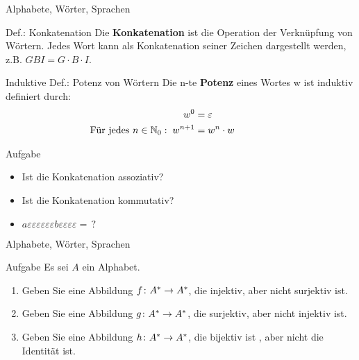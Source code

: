 \begin{frame}{Alphabete, Wörter, Sprachen}
	\begin{block}{Def.: Konkatenation}
		Die \textbf{Konkatenation} ist die Operation der Verknüpfung von Wörtern. Jedes Wort kann als Konkatenation seiner Zeichen dargestellt werden, z.B. \(GBI = G \cdot B \cdot I\).
	\end{block}
	\pause
	\begin{block}{Induktive Def.: Potenz von Wörtern}
		Die n-te \textbf{Potenz} eines Wortes w ist induktiv definiert durch:
		\begin{align*}
				w^{0} &= \varepsilon \hphantom{000000000000}\\
				\text{Für jedes } n \in \mathbb{N}_{0}: \; w^{n+1} & = w^{n} \cdot w
		\end{align*}
	\end{block}
	\pause
	\begin{exampleblock}{Aufgabe}
	\begin{itemize}
		\item Ist die Konkatenation assoziativ?\pause
		\item Ist die Konkatenation kommutativ?\pause
		\item \(a\varepsilon\varepsilon\varepsilon\varepsilon\varepsilon\varepsilon b\varepsilon\varepsilon\varepsilon\varepsilon = \, ?\)
	\end{itemize}		
	\end{exampleblock}
\end{frame}

\begin{frame}{Alphabete, Wörter, Sprachen}
	\begin{exampleblock}{Aufgabe}
		Es sei $A$ ein Alphabet.
		\begin{enumerate}
			\item Geben Sie eine Abbildung $f \colon A^{\ast} \to A^{\ast}$, die injektiv, aber nicht surjektiv ist.
			\item Geben Sie eine Abbildung $g \colon A^{\ast} \to A^{\ast}$, die surjektiv, aber nicht injektiv ist.
			\item Geben Sie eine Abbildung $h \colon A^{\ast} \to A^{\ast}$, die bijektiv ist , aber nicht die Identität ist.
		\end{enumerate}
	\end{exampleblock}
\end{frame}
	
